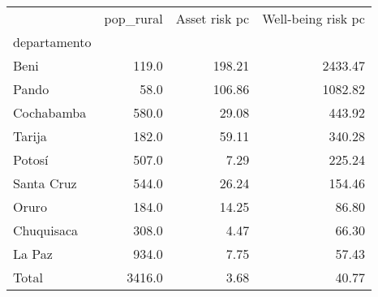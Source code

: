 \begin{tabular}{lrrr}
\toprule
{} &  pop\_rural &  Asset risk pc &  Well-being risk pc \\
departamento &            &                &                     \\
\midrule
Beni         &      119.0 &         198.21 &             2433.47 \\
Pando        &       58.0 &         106.86 &             1082.82 \\
Cochabamba   &      580.0 &          29.08 &              443.92 \\
Tarija       &      182.0 &          59.11 &              340.28 \\
Potosí       &      507.0 &           7.29 &              225.24 \\
Santa Cruz   &      544.0 &          26.24 &              154.46 \\
Oruro        &      184.0 &          14.25 &               86.80 \\
Chuquisaca   &      308.0 &           4.47 &               66.30 \\
La Paz       &      934.0 &           7.75 &               57.43 \\
Total        &     3416.0 &           3.68 &               40.77 \\
\bottomrule
\end{tabular}
